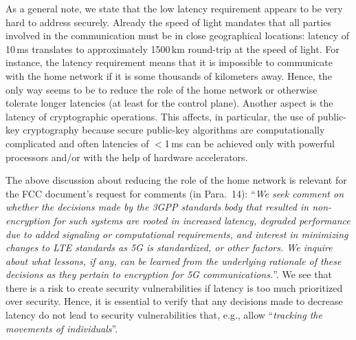 \documentclass[12pt]{llncs}
\newcommand\ques[1]{``\emph{#1}''}
\begin{document}
As a general note, we state that the low latency requirement appears to be very hard to address securely. Already the speed of light mandates that all parties involved in the communication must be in close geographical locations: latency of 10\,ms translates to approximately 1500\,km round-trip at the speed of light. For instance, the latency requirement means that it is impossible to communicate with the home network if it is some thousands of kilometers away. Hence, the only way seems to be to reduce the role of the home network or otherwise tolerate longer latencies (at least for the control plane). Another aspect is the latency of cryptographic operations. This affects, in particular, the use of public-key cryptography because secure public-key algorithms are computationally complicated and often latencies of $<$1\,ms can be achieved only with powerful processors and/or with the help of hardware accelerators. 

The above discussion about reducing the role of the home network is relevant for the FCC document's request for comments (in Para.~14): \ques{We seek comment on whether the decisions made by the 3GPP standards body that resulted in non-encryption for such systems are rooted in increased latency, degraded performance due to added signaling or computational requirements, and interest in minimizing changes to LTE standards as 5G is standardized, or other factors. We inquire about what lessons, if any, can be learned from the underlying rationale of these decisions as they pertain to encryption for 5G communications.}. We see that there is a risk to create security vulnerabilities if latency is too much prioritized over security. Hence, it is essential to verify that any decisions made to decrease latency do not lead to security vulnerabilities that, e.g., allow \ques{tracking the movements of individuals}.
\end{document}
